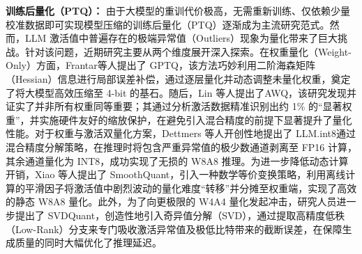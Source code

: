 \documentclass[10.5pt,compsoc,UTF8]{CjC}
\theoremstyle{mystyle}
\begin{document}
\textbf{训练后量化（PTQ）：} 由于大模型的重训代价极高，无需重新训练、仅依赖少量校准数据即可实现模型压缩的训练后量化（PTQ）逐渐成为主流研究范式。然而，LLM 激活值中普遍存在的极端异常值（Outliers）现象为量化带来了巨大挑战。针对该问题，近期研究主要从两个维度展开深入探索。在权重量化（Weight-Only）方面，Frantar等人提出了 GPTQ\cite{frantar2022gptq}，该方法巧妙利用二阶海森矩阵（Hessian）信息进行局部误差补偿，通过逐层量化并动态调整未量化权重，奠定了将大模型高效压缩至 4-bit 的基石。随后，Lin 等人提出了AWQ\cite{lin2024awq}，该研究发现并证实了并非所有权重同等重要；其通过分析激活数据精准识别出约 1\% 的“显著权重”，并实施硬件友好的缩放保护，在避免引入混合精度的前提下显著提升了量化性能。对于权重与激活双量化方案，Dettmers 等人开创性地提出了 LLM.int8\cite{LLMINT8}通过混合精度分解策略，在推理时将包含严重异常值的极少数通道剥离至 FP16 计算，其余通道量化为 INT8，成功实现了无损的 W8A8 推理。为进一步降低动态计算开销，Xiao 等人提出了 SmoothQuant\cite{xiao2023smoothquant}，引入一种数学等价变换策略，利用离线计算的平滑因子将激活值中剧烈波动的量化难度“转移”并分摊至权重端，实现了高效的静态 W8A8 量化。此外，为了向更极限的 W4A4 量化发起冲击，研究人员进一步提出了 SVDQuant\cite{li2024svdquant}，创造性地引入奇异值分解（SVD），通过提取高精度低秩（Low-Rank）分支来专门吸收激活异常值及极低比特带来的截断误差，在保障生成质量的同时大幅优化了推理延迟。
\end{document}
